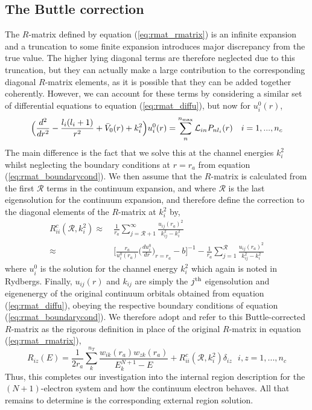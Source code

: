 \subsection{The Buttle correction}\label{ssec:buttle}
The $R$-matrix defined by equation (\ref{eq:rmat_rmatrix}) is an infinite expansion and a truncation to some finite expansion introduces major discrepancy from the true value. The higher lying diagonal terms are therefore neglected due to this truncation, but they can actually make a large contribution to the corresponding diagonal $R$-matrix elements, as it is possible that they can be added together coherently. However, we can account for these terms by considering a similar set of differential equations to equation (\ref{eq:rmat_diffu}), but now for $u^0_{i}(r)$,
\begin{equation}\label{eq:rmat_diffzerou}
\Big(\frac{d^2}{dr^2}-\frac{l_i(l_i+1)}{r^2}+\bar{V}_0(r)+k_{i}^2\Big)u_{i}^0(r)=\sum_n^{n_{{\rm max}}}\mathcal{L}_{in}P_{nl_i}(r) ~~~ i=1,...,n_c
\end{equation}
The main difference is the fact that we solve this at the channel energies $k_i^2$ whilst neglecting the boundary conditions at $r=r_a$ from equation (\ref{eq:rmat_boundarycond}). We then assume that the $R$-matrix is calculated from the first $\mathcal{R}$ terms in the continuum expansion, and where $\mathcal{R}$ is the last eigensolution for the continuum expansion, and therefore define the correction to the diagonal elements of the $R$-matrix at $k_i^2$ by,
\begin{equation}\label{eq:rmat_buttle}
\begin{split}
R_{ii}^c(\mathcal{R}, k_i^2)\approx &~ \frac{1}{r_a}\sum_{j=\mathcal{R}+1}^{\infty}\frac{u_{ij}(r_a)^2}{k_{ij}^2-k_i^2}\\
\approx&~ \Big[\frac{r_a}{u_i^0(r_a)}\Big(\frac{du_i^0}{dr}\Big)_{r=r_a}-b\Big]^{-1}-\frac{1}{r_a}\sum_{j=1}^{\mathcal{R}}\frac{u_{ij}(r_a)^2}{k_{ij}^2-k_i^2}
\end{split}
\end{equation}
where $u_i^0$ is the solution for the channel energy $k_i^2$ which again is noted in Rydbergs. Finally, $u_{ij}(r)$ and $k_{ij}$ are simply the $j^{\rm th}$ eigensolution and eigenenergy of the original continuum orbitals obtained from equation (\ref{eq:rmat_diffu}), obeying the respective boundary conditions of equation (\ref{eq:rmat_boundarycond}). We therefore adopt and refer to this Buttle-corrected $R$-matrix as the rigorous definition in place of the original $R$-matrix in equation (\ref{eq:rmat_rmatrix}),
\begin{equation}\label{eq:rmat_newrmatrix}
R_{iz}(E)=\frac{1}{2r_a}\sum_k^{n_T}\frac{w_{ik}(r_a)w_{zk}(r_a)}{E_k^{N+1}-E}+R_{ii}^c(\mathcal{R}, k_i^2)\delta_{iz} ~~~ i,z=1,...,n_c
\end{equation}
Thus, this completes our investigation into the internal region description for the $(N+1)$-electron system and how the continuum electron behaves. All that remains to determine is the corresponding external region solution.

